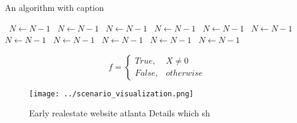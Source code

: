 \documentclass[a4paper]{article}
\begin{document}
\begin{algorithm}
\caption{An algorithm with caption}
\begin{algorithmic}
\    \State $N \gets N - 1$
\    \State $N \gets N - 1$
\    \State $N \gets N - 1$
\    \State $N \gets N - 1$
\    \State $N \gets N - 1$
\    \State $N \gets N - 1$
\    \State $N \gets N - 1$
\    \State $N \gets N - 1$
\    \State $N \gets N - 1$
\    \State $N \gets N - 1$
\    \State $N \gets N - 1$
\EndWhile
\end{algorithmic}
\end{algorithm}

\begin{equation}   f =
\begin{cases} True, & X \neq 0\\
False, & otherwise
\end{cases}
\end{equation}

\begin{figure}
\centering
\texttt{[image: ../scenario\_visualization.png]}
\caption{Early realestate website atlanta Details which sh
}
\end{figure}
 
\end{document}
